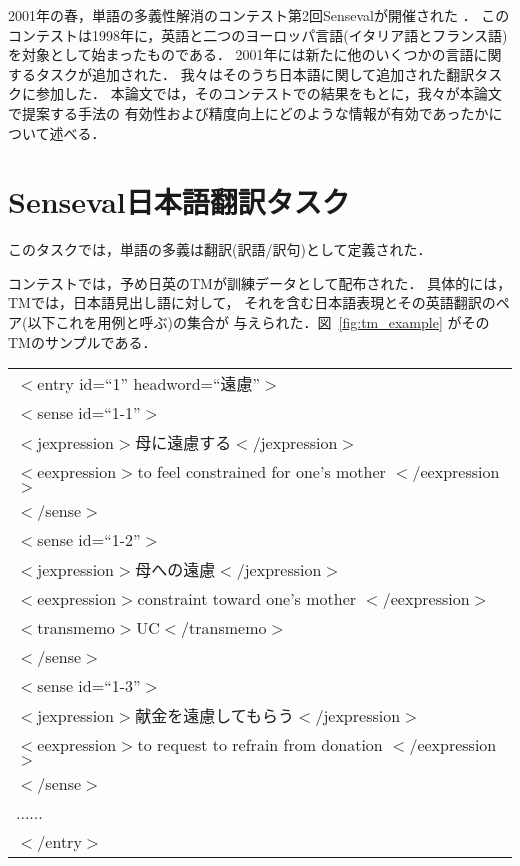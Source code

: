 2001年の春，単語の多義性解消のコンテスト第2回{\sc Senseval}が開催された
\cite{senseval2:homepage}
．
このコンテストは1998年に，英語と二つのヨーロッパ言語(イタリア語とフランス語)
を対象として始まったものである．
2001年には新たに他のいくつかの言語に関するタスクが追加された．
我々はそのうち日本語に関して追加された翻訳タスクに参加した．
本論文では，そのコンテストでの結果をもとに，我々が本論文で提案する手法の
有効性および精度向上にどのような情報が有効であったかについて述べる．

\section{{\sc Senseval}日本語翻訳タスク}

このタスクでは，単語の多義は翻訳(訳語/訳句)として定義された．

コンテストでは，予め日英のTMが訓練データとして配布された．
具体的には，TMでは，日本語見出し語に対して，
それを含む日本語表現とその英語翻訳のペア(以下これを用例と呼ぶ)の集合が
与えられた．図~\ref{fig:tm_example} がそのTMのサンプルである．

\begin{figure*}[htbp]
  \begin{center}
    \begin{tabular}[c]{l}
      $<$entry id=``1'' headword=``遠慮''$>$\\
      \q  $<$sense id=``1-1''$>$\\
      \q\q    $<$jexpression$>$母に遠慮する$<$/jexpression$>$\\
      \q\q    $<$eexpression$>$to feel constrained for one's mother
      $<$/eexpression$>$\\
      \q  $<$/sense$>$\\
      \q  $<$sense id=``1-2''$>$\\
      \q\q    $<$jexpression$>$母への遠慮$<$/jexpression$>$\\
      \q\q    $<$eexpression$>$constraint toward one's mother
      $<$/eexpression$>$\\
      \q\q    $<$transmemo$>$UC$<$/transmemo$>$\\
      \q  $<$/sense$>$\\
      \q  $<$sense id=``1-3''$>$\\
      \q\q    $<$jexpression$>$献金を遠慮してもらう$<$/jexpression$>$\\
      \q\q    $<$eexpression$>$to request to refrain from donation
      $<$/eexpression$>$\\
      \q  $<$/sense$>$\\
      \q  ......\\
      $<$/entry$>$\\
    \end{tabular}
    \caption{TMの例}
    \label{fig:tm_example}
  \end{center}
\end{figure*}

